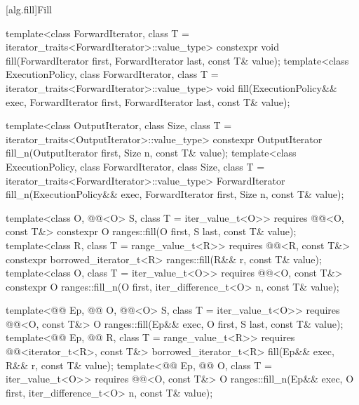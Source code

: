 [alg.fill]{Fill}

%
%
\begin{itemdecl}
template<class ForwardIterator, class T = iterator_traits<ForwardIterator>::value_type>
  constexpr void fill(ForwardIterator first, ForwardIterator last, const T& value);
template<class ExecutionPolicy, class ForwardIterator,
         class T = iterator_traits<ForwardIterator>::value_type>
  void fill(ExecutionPolicy&& exec,
            ForwardIterator first, ForwardIterator last, const T& value);

template<class OutputIterator, class Size, class T = iterator_traits<OutputIterator>::value_type>
  constexpr OutputIterator fill_n(OutputIterator first, Size n, const T& value);
template<class ExecutionPolicy, class ForwardIterator, class Size,
         class T = iterator_traits<ForwardIterator>::value_type>
  ForwardIterator fill_n(ExecutionPolicy&& exec,
                         ForwardIterator first, Size n, const T& value);

template<class O, @@<O> S, class T = iter_value_t<O>>
  requires @@<O, const T&>
  constexpr O ranges::fill(O first, S last, const T& value);
template<class R, class T = range_value_t<R>>
  requires @@<R, const T&>
  constexpr borrowed_iterator_t<R> ranges::fill(R&& r, const T& value);
template<class O, class T = iter_value_t<O>>
  requires @@<O, const T&>
  constexpr O ranges::fill_n(O first, iter_difference_t<O> n, const T& value);

template<@@ Ep, @@ O, @@<O> S,
         class T = iter_value_t<O>>
  requires @@<O, const T&>
  O ranges::fill(Ep&& exec, O first, S last, const T& value);
template<@@ Ep, @@ R, class T = range_value_t<R>>
  requires @@<iterator_t<R>, const T&>
  borrowed_iterator_t<R> fill(Ep&& exec, R&& r, const T& value);
template<@@ Ep, @@ O, class T = iter_value_t<O>>
  requires @@<O, const T&>
  O ranges::fill_n(Ep&& exec, O first, iter_difference_t<O> n, const T& value);
\end{itemdecl}

